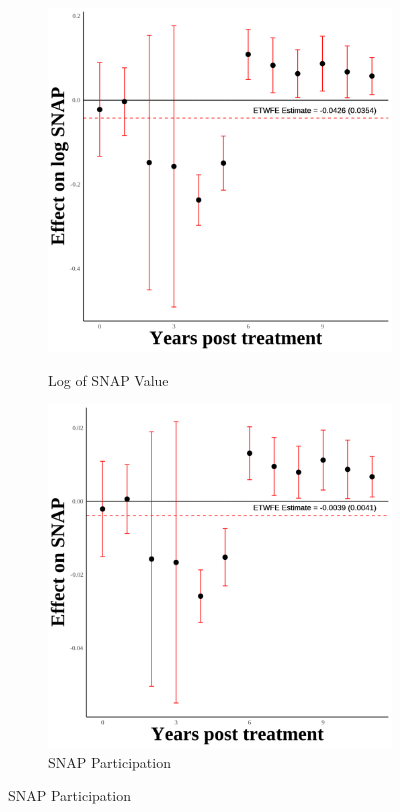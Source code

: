 \documentclass[12pt,english]{article}
\begin{document}
\begin{figure}[H]
  \begin{subfigure}[b]{0.3\textwidth}
    \centering
    \caption{Log of SNAP Value}
    \includegraphics[width=\linewidth]{figures/plot92-ln_snap_event_study-fourth.png}
    \label{fig:ln-snap-fourth}
  \end{subfigure}
  \hfill
  \begin{subfigure}[b]{0.3\textwidth}
    \centering
    \caption{SNAP Participation}
    \includegraphics[width=\linewidth]{figures/plot93-snap_event_study-fourth.png}

\end{subfigure}
\end{figure}
\end{document}
